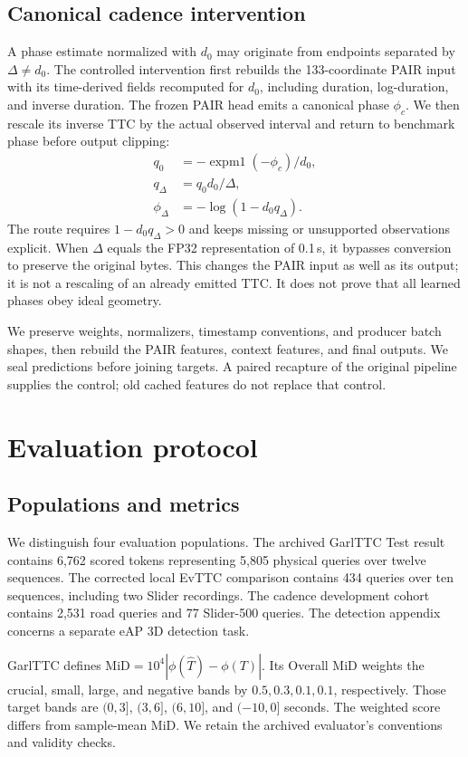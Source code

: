 \documentclass[twocolumn,letterpaper]{article}
\begin{document}
\subsection{Canonical cadence intervention}
A phase estimate normalized with $d_0$ may originate from endpoints separated by $\Delta\neq d_0$. The controlled intervention first rebuilds the 133-coordinate PAIR input with its time-derived fields recomputed for $d_0$, including duration, log-duration, and inverse duration. The frozen PAIR head emits a canonical phase $\phi_c$. We then rescale its inverse TTC by the actual observed interval and return to benchmark phase before output clipping:
\begin{align}
 q_0&=-\operatorname{expm1}(-\phi_c)/d_0,\\
 q_\Delta&=q_0d_0/\Delta,\\
 \phi_\Delta&=-\log(1-d_0q_\Delta).
\label{eq:cadence}
\end{align}
The route requires $1-d_0q_\Delta>0$ and keeps missing or unsupported observations explicit. When $\Delta$ equals the FP32 representation of 0.1\,s, it bypasses conversion to preserve the original bytes. This changes the PAIR input as well as its output; it is not a rescaling of an already emitted TTC. It does not prove that all learned phases obey ideal geometry.

We preserve weights, normalizers, timestamp conventions, and producer batch shapes, then rebuild the PAIR features, context features, and final outputs. We seal predictions before joining targets. A paired recapture of the original pipeline supplies the control; old cached features do not replace that control.

\section{Evaluation protocol}
\subsection{Populations and metrics}
We distinguish four evaluation populations. The archived GarlTTC Test result contains 6,762 scored tokens representing 5,805 physical queries over twelve sequences. The corrected local EvTTC comparison contains 434 queries over ten sequences, including two Slider recordings. The cadence development cohort contains 2,531 road queries and 77 Slider-500 queries. The detection appendix concerns a separate eAP 3D detection task.

GarlTTC defines $\mathrm{MiD}=10^4|\phi(\widehat T)-\phi(T)|$. Its Overall MiD weights the crucial, small, large, and negative bands by $0.5,0.3,0.1,0.1$, respectively. Those target bands are $(0,3]$, $(3,6]$, $(6,10]$, and $(-10,0]$ seconds. The weighted score differs from sample-mean MiD. We retain the archived evaluator's conventions and validity checks.
\end{document}
